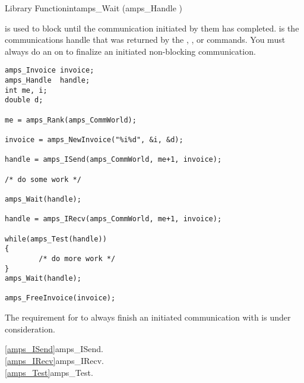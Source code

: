 \begin{deftypefn}{Library Function}{int}{amps\_Wait}
(amps_Handle )

\DESCRIPTION

 is used to block until the communication initiated by
them has completed.   is the communications handle that
was returned by the , , or
 commands.  You must always do an
 on to finalize an initiated non-blocking
communication.

\EXAMPLE

\begin{display}\begin{verbatim}
amps_Invoice invoice;
amps_Handle  handle;
int me, i;
double d;

me = amps_Rank(amps_CommWorld);

invoice = amps_NewInvoice("%i%d", &i, &d);

handle = amps_ISend(amps_CommWorld, me+1, invoice);

/* do some work */

amps_Wait(handle);

handle = amps_IRecv(amps_CommWorld, me+1, invoice);

while(amps_Test(handle))
{
        /* do more work */
}
amps_Wait(handle);

amps_FreeInvoice(invoice);
\end{verbatim}\end{display}

\NOTES

The requirement for to always finish an initiated communication with
 is under consideration.

\SEEALSO
\vref{amps_ISend}{amps\_ISend}. \\
\vref{amps_IRecv}{amps\_IRecv}. \\
\vref{amps_Test}{amps\_Test}. \\

\end{deftypefn}


